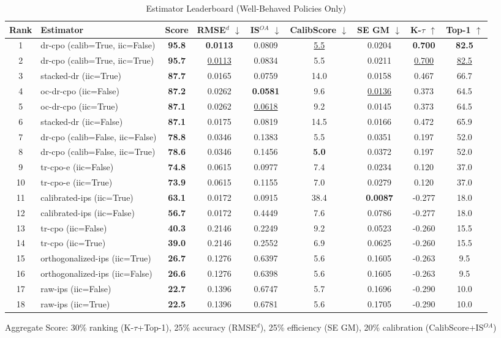 \begin{table}[htbp]
\centering
\caption{Estimator Leaderboard (Well-Behaved Policies Only)}
\label{tab:leaderboard}
\begin{tabular}{cl|c|cccccc}
\toprule
Rank & Estimator & Score & RMSE$^d$ $\downarrow$ & IS$^{OA}$ $\downarrow$ & CalibScore $\downarrow$ & SE GM $\downarrow$ & K-$\tau$ $\uparrow$ & Top-1 $\uparrow$ \\
\midrule
1 & dr-cpo (calib=True, iic=False) & \textbf{95.8} & \textbf{0.0113} & 0.0809 & \underline{5.5} & 0.0204 & \textbf{0.700} & \textbf{82.5} \\
2 & dr-cpo (calib=True, iic=True) & \textbf{95.7} & \underline{0.0113} & 0.0834 & 5.5 & 0.0211 & \underline{0.700} & \underline{82.5} \\
3 & stacked-dr (iic=True) & \textbf{87.7} & 0.0165 & 0.0759 & 14.0 & 0.0158 & 0.467 & 66.7 \\
4 & oc-dr-cpo (iic=False) & \textbf{87.2} & 0.0262 & \textbf{0.0581} & 9.6 & \underline{0.0136} & 0.373 & 64.5 \\
5 & oc-dr-cpo (iic=True) & \textbf{87.1} & 0.0262 & \underline{0.0618} & 9.2 & 0.0145 & 0.373 & 64.5 \\
6 & stacked-dr (iic=False) & \textbf{87.1} & 0.0175 & 0.0819 & 14.5 & 0.0166 & 0.472 & 65.9 \\
7 & dr-cpo (calib=False, iic=False) & \textbf{78.8} & 0.0346 & 0.1383 & 5.5 & 0.0351 & 0.197 & 52.0 \\
8 & dr-cpo (calib=False, iic=True) & \textbf{78.6} & 0.0346 & 0.1456 & \textbf{5.0} & 0.0372 & 0.197 & 52.0 \\
9 & tr-cpo-e (iic=False) & \textbf{74.8} & 0.0615 & 0.0977 & 7.4 & 0.0234 & 0.120 & 37.0 \\
10 & tr-cpo-e (iic=True) & \textbf{73.9} & 0.0615 & 0.1155 & 7.0 & 0.0279 & 0.120 & 37.0 \\
11 & calibrated-ips (iic=True) & \textbf{63.1} & 0.0172 & 0.0915 & 38.4 & \textbf{0.0087} & -0.277 & 18.0 \\
12 & calibrated-ips (iic=False) & \textbf{56.7} & 0.0172 & 0.4449 & 7.6 & 0.0786 & -0.277 & 18.0 \\
13 & tr-cpo (iic=False) & \textbf{40.3} & 0.2146 & 0.2249 & 9.2 & 0.0523 & -0.260 & 15.5 \\
14 & tr-cpo (iic=True) & \textbf{39.0} & 0.2146 & 0.2552 & 6.9 & 0.0625 & -0.260 & 15.5 \\
15 & orthogonalized-ips (iic=True) & \textbf{26.7} & 0.1276 & 0.6397 & 5.6 & 0.1605 & -0.263 & 9.5 \\
16 & orthogonalized-ips (iic=False) & \textbf{26.6} & 0.1276 & 0.6398 & 5.6 & 0.1605 & -0.263 & 9.5 \\
17 & raw-ips (iic=False) & \textbf{22.7} & 0.1396 & 0.6747 & 5.7 & 0.1696 & -0.290 & 10.0 \\
18 & raw-ips (iic=True) & \textbf{22.5} & 0.1396 & 0.6781 & 5.6 & 0.1705 & -0.290 & 10.0 \\
\bottomrule
\end{tabular}
\footnotesize{Aggregate Score: 30\% ranking (K-$\tau$+Top-1), 25\% accuracy (RMSE$^d$), 25\% efficiency (SE GM), 20\% calibration (CalibScore+IS$^{OA}$)}
\end{table}